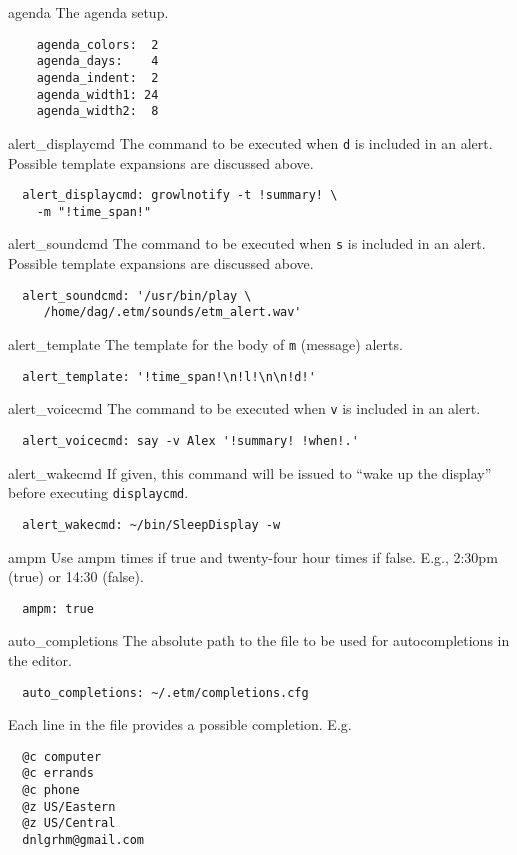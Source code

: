 \documentclass[10pt,landscape]{article}
\begin{document}
\begin{multicols}{3}
\begin{compactdesc}
\item[agenda] The agenda setup.
\begin{verbatim}
    agenda_colors:  2
    agenda_days:    4
    agenda_indent:  2
    agenda_width1: 24
    agenda_width2:  8
\end{verbatim}

\item[alert\_displaycmd] The command to be executed when \verb'd' is included in an alert. Possible template expansions are discussed above.
\begin{verbatim}
  alert_displaycmd: growlnotify -t !summary! \
    -m "!time_span!"
\end{verbatim}

\item[alert\_soundcmd] The command to be executed when \verb's' is included in an alert. Possible template expansions are discussed above.
\begin{verbatim}
  alert_soundcmd: '/usr/bin/play \
     /home/dag/.etm/sounds/etm_alert.wav'
\end{verbatim}

\item[alert\_template] The template for the body of \verb'm' (message) alerts.
\begin{verbatim}
  alert_template: '!time_span!\n!l!\n\n!d!'
\end{verbatim}

\item[alert\_voicecmd] The command to be executed when \verb'v' is included in an alert.
\begin{verbatim}
  alert_voicecmd: say -v Alex '!summary! !when!.'
\end{verbatim}

\item[alert\_wakecmd] If given, this command will be issued to ``wake up the display'' before executing \verb'displaycmd'.
\begin{verbatim}
  alert_wakecmd: ~/bin/SleepDisplay -w
\end{verbatim}

\item[ampm] Use ampm times if true and twenty-four hour times if false. E.g., 2:30pm (true) or 14:30 (false).
\begin{verbatim}
  ampm: true
\end{verbatim}

\item[auto\_completions] The absolute path to the file to be used for autocompletions in the editor.
\begin{verbatim}
  auto_completions: ~/.etm/completions.cfg
\end{verbatim}
Each line in the file provides a possible completion. E.g.
\begin{verbatim}
  @c computer
  @c errands
  @c phone
  @z US/Eastern
  @z US/Central
  dnlgrhm@gmail.com
\end{verbatim}


\end{compactdesc}
\end{multicols}
\end{document}
